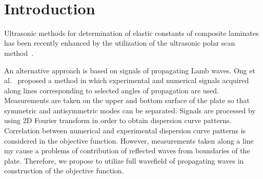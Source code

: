 \documentclass[runningheads]{llncs}
\begin{document}
%
\\[2em]
%
\section{Introduction}

Ultrasonic methods for determination of elastic constants of composite laminates has been recently enhanced by the utilization of the ultrasonic polar scan method~\cite{Martens2019a}.

An alternative approach is based on signals of propagating Lamb waves.
Ong et al.~\cite{Ong2016} proposed a method in which experimental and numerical signals acquired along lines corresponding to selected angles of propagation are used. 
Measurements are taken on the upper and bottom surface of the plate so that symmetric and antisymmetric modes can be separated.
Signals are processed by using 2D Fourier transform in order to obtain dispersion curve patterns. 
Correlation between numerical and experimental dispersion curve patterns is considered in the objective function.
However, measurements taken along a line my cause a problems of contribution of reflected waves from boundaries of the plate.
Therefore, we propose to utilize full wavefield of propagating waves in construction of the objective function.
%
%
%
 
 
%
\end{document}
